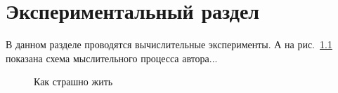 \chapter{Экспериментальный раздел}
\label{cha:research}

В данном разделе проводятся вычислительные эксперименты.
А на рис.~\ref{fig:spire01} показана схема мыслительного процесса автора...

\begin{figure}
  \centering
  \caption{Как страшно жить}
  \label{fig:spire01}
\end{figure}


